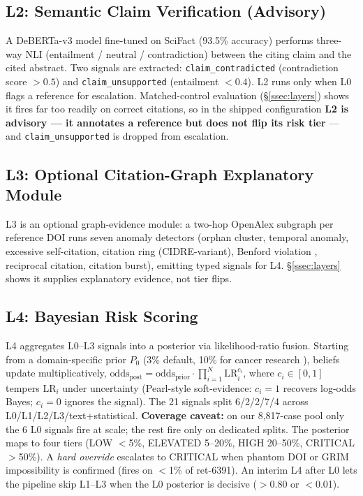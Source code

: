 \documentclass[runningheads]{llncs}
\let\citep\cite
\begin{document}
\subsection{L2: Semantic Claim Verification (Advisory)}

A DeBERTa-v3 model fine-tuned on SciFact \cite{wadden2020fact} (93.5\% accuracy) performs three-way NLI (entailment / neutral / contradiction) between the citing claim and the cited abstract. Two signals are extracted: \texttt{claim\_contradicted} (contradiction score $>0.5$) and \texttt{claim\_unsupported} (entailment $<0.4$). L2 runs only when L0 flags a reference for escalation. Matched-control evaluation (\S\ref{ssec:layers}) shows it fires far too readily on correct citations, so in the shipped configuration \textbf{L2 is advisory --- it annotates a reference but does not flip its risk tier} --- and \texttt{claim\_unsupported} is dropped from escalation.

\subsection{L3: Optional Citation-Graph Explanatory Module}

L3 is an optional graph-evidence module: a two-hop OpenAlex subgraph per reference DOI runs seven anomaly detectors (orphan cluster, temporal anomaly, excessive self-citation, citation ring (CIDRE-variant), Benford violation \cite{campanario2011benford}, reciprocal citation, citation burst), emitting typed signals for L4. \S\ref{ssec:layers} shows it supplies explanatory evidence, not tier flips.

\subsection{L4: Bayesian Risk Scoring}

L4 aggregates L0--L3 signals into a posterior via likelihood-ratio fusion. Starting from a domain-specific prior $P_0$ (3\% default, 10\% for cancer research \citep{scancar2026papermill}), beliefs update multiplicatively, $\text{odds}_{\text{post}} = \text{odds}_{\text{prior}} \cdot \prod_{i=1}^{N} \text{LR}_i^{c_i}$, where $c_i \in [0,1]$ tempers $\text{LR}_i$ under uncertainty (Pearl-style soft-evidence: $c_i{=}1$ recovers log-odds Bayes; $c_i{=}0$ ignores the signal). The 21 signals split 6/2/2/7/4 across L0/L1/L2/L3/text+statistical. \textbf{Coverage caveat:} on our 8{,}817-case pool only the 6 L0 signals fire at scale; the rest fire only on dedicated splits. The posterior maps to four tiers (LOW $<$5\%, ELEVATED 5--20\%, HIGH 20--50\%, CRITICAL $>$50\%). A \emph{hard override} escalates to CRITICAL when phantom DOI or GRIM impossibility is confirmed (fires on $<$1\% of ret-6391). An interim L4 after L0 lets the pipeline skip L1--L3 when the L0 posterior is decisive ($>$0.80 or $<$0.01).
\end{document}
